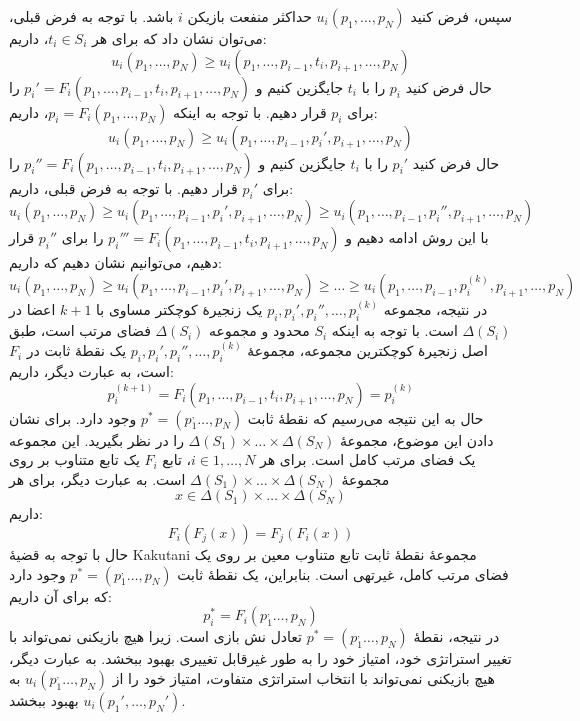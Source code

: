 سپس، فرض کنید $u_i(p_1, \dots, p_N)$ حداکثر منفعت بازیکن $i$ باشد. با توجه به فرض قبلی، می‌توان نشان داد که برای هر $t_i \in S_i$، داریم:
$$u_i(p_1, \dots, p_N) \geq u_i(p_1, \dots, p_{i-1}, t_i, p_{i+1}, \dots, p_N)$$
حال فرض کنید $p_i$ را با $t_i$ جایگزین کنیم و $p_i' = F_i(p_1, \dots, p_{i-1}, t_i, p_{i+1}, \dots, p_N)$ را برای $p_i$ قرار دهیم. با توجه به اینکه $p_i = F_i(p_1, \dots, p_N)$، داریم:
$$u_i(p_1, \dots, p_N) \geq u_i(p_1, \dots, p_{i-1}, p_i', p_{i+1}, \dots, p_N)$$
حال فرض کنید $p_i'$ را با $t_i$ جایگزین کنیم و $p_i'' = F_i(p_1, \dots, p_{i-1}, t_i, p_{i+1}, \dots, p_N)$ را برای $p_i'$ قرار دهیم. با توجه به فرض قبلی، داریم:
$$u_i(p_1, \dots, p_N) \geq u_i(p_1, \dots, p_{i-1}, p_i', p_{i+1}, \dots, p_N) \geq u_i(p_1, \dots, p_{i-1}, p_i'', p_{i+1}, \dots, p_N)$$
با این روش ادامه دهیم و $p_i''' = F_i(p_1, \dots, p_{i-1}, t_i, p_{i+1}, \dots, p_N)$ را برای $p_i''$ قرار دهیم، می‌توانیم نشان دهیم که داریم:
$$u_i(p_1, \dots, p_N) \geq u_i(p_1, \dots, p_{i-1}, p_i', p_{i+1}, \dots, p_N) \geq \dots \geq u_i(p_1, \dots, p_{i-1}, p_i^{(k)}, p_{i+1}, \dots, p_N)$$
در نتیجه، مجموعه $p_i, p_i', p_i'', \dots, p_i^{(k)}$ یک زنجیرهٔ کوچکتر مساوی با $k+1$ اعضا در $\Delta(S_i)$ است. با توجه به اینکه $S_i$ محدود و مجموعه $\Delta(S_i)$ فضای مرتب است، طبق اصل زنجیرهٔ کوچکترین مجموعه، مجموعهٔ $p_i, p_i', p_i'', \dots, p_i^{(k)}$ یک نقطهٔ ثابت در $F_i$ است، به عبارت دیگر، داریم:
$$p_i^{(k+1)} = F_i(p_1, \dots, p_{i-1}, t_i, p_{i+1}, \dots, p_N) = p_i^{(k)}$$
حال به این نتیجه می‌رسیم که نقطهٔ ثابت $p^* = (p_1^, \dots, p_N)$ وجود دارد. برای نشان دادن این موضوع، مجموعهٔ $\Delta(S_1) \times \dots \times \Delta(S_N)$ را در نظر بگیرید. این مجموعه یک فضای مرتب کامل است. برای هر $i \in {1, \dots, N}$، تابع $F_i$ یک تابع متناوب بر روی مجموعهٔ $\Delta(S_1) \times \dots \times \Delta(S_N)$ است. به عبارت دیگر، برای هر 
$$x \in \Delta(S_1) \times \dots \times \Delta(S_N)$$
داریم:
$$F_i(F_j(x)) = F_j(F_i(x))$$
حال با توجه به قضیهٔ Kakutani مجموعهٔ نقطهٔ ثابت تابع متناوب معین بر روی یک فضای مرتب کامل، غیرتهی است. بنابراین، یک نقطهٔ ثابت $p^* = (p_1^, \dots, p_N)$ وجود دارد که برای آن داریم:
$$p_i^* = F_i(p_1^, \dots, p_N)$$
در نتیجه، نقطهٔ $p^* = (p_1^, \dots, p_N)$ تعادل نش بازی است. زیرا هیچ بازیکنی نمی‌تواند با تغییر استراتژی خود، امتیاز خود را به طور غیرقابل تغییری بهبود ببخشد. به عبارت دیگر، هیچ بازیکنی نمی‌تواند با انتخاب استراتژی متفاوت، امتیاز خود را از $u_i(p_1^, \dots, p_N)$ به $u_i(p_1', \dots, p_N')$ بهبود ببخشد.

